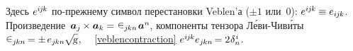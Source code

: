 \begin{otherlanguage}{russian}
\vspace{-0.2em} \noindent
Здесь ${e^{i\hspace{-0.1ex}j\hspace{-0.1ex}k}}$ по\hbox{-}прежнему символ перестановки Veblen’а (${\pm 1}$ или~$0$):
${e^{i\hspace{-0.1ex}j\hspace{-0.1ex}k} \hspace{-0.1ex} \equiv e_{i\hspace{-0.1ex}j\hspace{-0.1ex}k}}$.
Произведение~${\bm{a}_j \hspace{-0.1ex} \times \bm{a}_k = \hspace{.1ex} \levicivita_{j\hspace{-0.1ex}kn} \hspace{.2ex} \bm{a}^n\hspace{-0.12ex}}$, компоненты тензора Л\'{е}ви\hbox{-\!}Чив\'{и}ты~${ \levicivita_{j\hspace{-0.1ex}kn} \hspace{-0.2ex} = \pm \hspace{.33ex} e_{j\hspace{-0.1ex}kn} \hspace{-0.1ex} \sqrt{\hspace{-0.36ex}\mathstrut{\textsl{g}}} }$,
~~\eqref{veblencontraction} ${e^{i\hspace{-0.1ex}j\hspace{-0.1ex}k} e_{j\hspace{-0.1ex}kn} \hspace{-0.25ex} = 2 \hspace{.1ex} \delta_n^{\hspace{.1ex}i}}$.


\end{otherlanguage}
